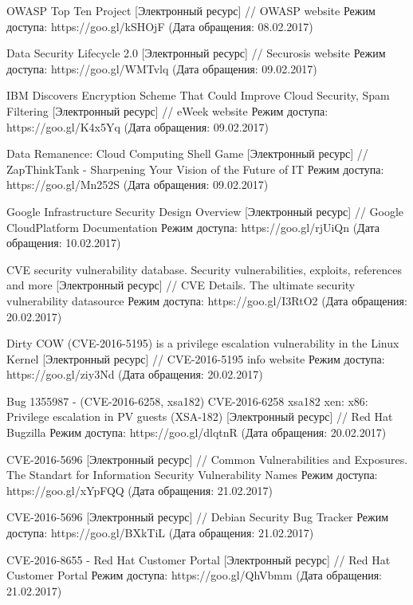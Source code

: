 \begin{thebibliography}{00}
    OWASP Top Ten Project
    [Электронный ресурс] //
    OWASP website
    Режим доступа: https://goo.gl/kSHOjF
    (Дата обращения: 08.02.2017)

    Data Security Lifecycle 2.0
    [Электронный ресурс] //
    Securosis website
    Режим доступа: https://goo.gl/WMTvlq
    (Дата обращения: 09.02.2017)

    IBM Discovers Encryption Scheme That Could Improve Cloud Security, Spam Filtering
    [Электронный ресурс] //
    eWeek website
    Режим доступа: https://goo.gl/K4x5Yq
    (Дата обращения: 09.02.2017)

    Data Remanence: Cloud Computing Shell Game
    [Электронный ресурс] //
    ZapThinkTank - Sharpening Your Vision of the Future of IT
    Режим доступа: https://goo.gl/Mn252S
    (Дата обращения: 09.02.2017)

    Google Infrastructure Security Design Overview
    [Электронный ресурс] //
    Google CloudPlatform Documentation
    Режим доступа: https://goo.gl/rjUiQn
    (Дата обращения: 10.02.2017)

    CVE security vulnerability database. Security vulnerabilities, exploits, references and more
    [Электронный ресурс] //
    CVE Details. The ultimate security vulnerability datasource
    Режим доступа: https://goo.gl/I3RtO2
    (Дата обращения: 20.02.2017)

    Dirty COW (CVE-2016-5195) is a privilege escalation vulnerability in the Linux Kernel
    [Электронный ресурс] //
    CVE-2016-5195 info website
    Режим доступа: https://goo.gl/ziy3Nd
    (Дата обращения: 20.02.2017)

    Bug 1355987 - (CVE-2016-6258, xsa182) CVE-2016-6258 xsa182 xen: x86: Privilege escalation in PV guests (XSA-182)
    [Электронный ресурс] //
    Red Hat Bugzilla
    Режим доступа: https://goo.gl/dlqtnR
    (Дата обращения: 20.02.2017)

    CVE-2016-5696
    [Электронный ресурс] //
    Common Vulnerabilities and Exposures. The Standart for Information Security Vulnerability Names
    Режим доступа: https://goo.gl/xYpFQQ
    (Дата обращения: 21.02.2017)

    CVE-2016-5696
    [Электронный ресурс] //
    Debian Security Bug Tracker
    Режим доступа: https://goo.gl/BXkTiL
    (Дата обращения: 21.02.2017)

    CVE-2016-8655 - Red Hat Customer Portal
    [Электронный ресурс] //
    Red Hat Customer Portal
    Режим доступа: https://goo.gl/QhVbmm
    (Дата обращения: 21.02.2017)


\end{thebibliography}
